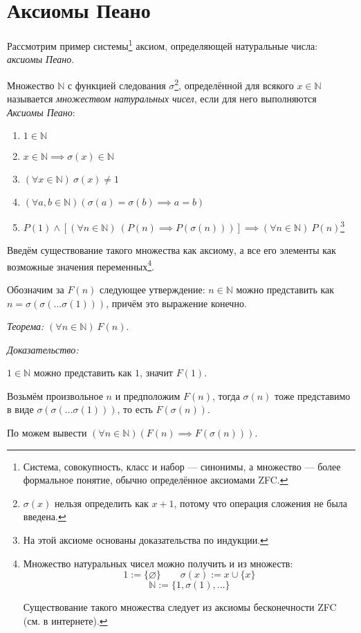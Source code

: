 \section{Аксиомы Пеано}

Рассмотрим пример системы\footnote{
	Система, совокупность, класс и набор --- синонимы, а множество --- более формальное
	понятие, обычно определённое аксиомами ZFC.
} аксиом, определяющей натуральные числа: {\it аксиомы Пеано}.

\newcommand\N{\mathbb{N}}
Множество $\N$ с функцией следования $\sigma$\footnote{$\sigma(x)$ нельзя определить
	как $x+1$, потому что операция сложения не была введена.},
определённой для всякого $x\in\N$
называется {\it множеством натуральных чисел}, если для него
выполняются {\it Аксиомы Пеано}:
\begin{enumerate}
	\item{}$1\in \N$
	\item{}$x\in\N\implies \sigma(x)\in\N$
	\item{}$(\forall x\in\N)~\sigma(x)\neq 1$
	\item{}$(\forall a,b\in\N)(\sigma(a)=\sigma(b)\implies a=b)$
	\item{}$P(1)\land [(\forall n\in\N)~(P(n)\implies P(\sigma(n)))]
		\implies(\forall n\in\N)~P(n)$\footnote{На этой аксиоме основаны
		доказательства по индукции.}
\end{enumerate}

\pagebreak

Введём существование такого множества как аксиому, а
все его элементы как
возможные значения переменных\footnote{Множество натуральных чисел можно
	получить и из множеств:
	\[
		1:=\{\varnothing\}\qquad\sigma(x):=x\cup \{x\}
	\]
	\[
		\N:=\{1,\sigma(1),...\}
	\]

	Существование такого множества следует из
	аксиомы бесконечности ZFC (см. в интернете).}.

Обозначим за $F(n)$ следующее утверждение: ${n\in\N}$ можно представить как
$n=\sigma(\sigma(...\sigma(1)))$, причём это выражение конечно.

{\it Теорема:} $(\forall n\in\N)~F(n)$.

	{\it Доказательство:}

$1\in\N$ можно представить как $1$, значит $F(1)$.

Возьмём произвольное $n$ и предположим $F(n)$, тогда $\sigma(n)$ тоже
представимо в виде $\sigma(\sigma(...\sigma(1)))$, то есть $F(\sigma(n))$.

По \Aii{} можем вывести $(\forall n\in\N)(F(n)\implies F(\sigma(n)))$.

